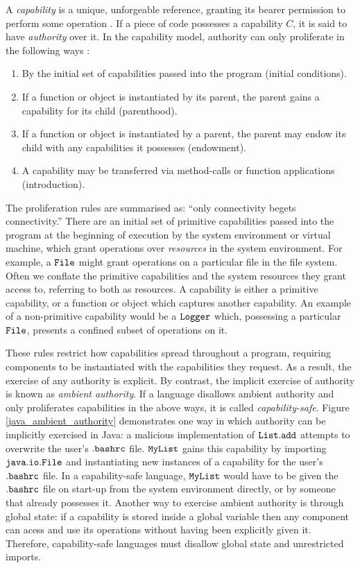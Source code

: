 A \textit{capability} is a unique, unforgeable reference, granting its bearer permission to perform some operation \cite{dennis66}. If a piece of code possesses a capability $C$, it is said to have \textit{authority} over it. In the capability model, authority can only proliferate in the following ways \cite{miller06}:

\begin{enumerate}
	\item By the initial set of capabilities passed into the program (initial conditions).
	\item If a function or object is instantiated by its parent, the parent gains a capability for its child (parenthood).
	\item If a function or object is instantiated by a parent, the parent may endow its child with any capabilities it possesses (endowment).
	\item A capability may be transferred via method-calls or function applications (introduction).
\end{enumerate}

The proliferation rules are summarised as: ``only connectivity begets connectivity.'' There are an initial set of primitive capabilities passed into the program at the beginning of execution by the system environment or virtual machine, which grant operations over \textit{resources} in the system environment. For example, a $\mathtt{File}$ might grant operations on a particular file in the file system. Often we conflate the primitive capabilities and the system resources they grant access to, referring to both as resources. A capability is either a primitive capability, or a function or object which captures another capability. An example of a non-primitive capability would be a $\mathtt{Logger}$ which, possessing a particular $\mathtt{File}$, presents a confined subset of operations on it.

These rules restrict how capabilities spread throughout a program, requiring components to be instantiated with the capabilities they request. As a result, the exercise of any authority is explicit. By contrast, the implicit exercise of authority is known as \textit{ambient authority}. If a language disallows ambient authority and only proliferates capabilities in the above ways, it is called \textit{capability-safe}. Figure \ref{java_ambient_authority} demonstrates one way in which authority can be implicitly exercised in Java: a malicious implementation of $\mathtt{List.add}$ attempts to overwrite the user's $\mathtt{.bashrc}$ file. $\mathtt{MyList}$ gains this capability by importing $\mathtt{java.io.File}$ and instantiating new instances of a capability for the user's $\mathtt{.bashrc}$ file. In a capability-safe language, $\mathtt{MyList}$ would have to be given the $\mathtt{.bashrc}$ file on start-up from the system environment directly, or by someone that already possesses it. Another way to exercise ambient authority is through global state: if a capability is stored inside a global variable then any component can acess and use its operations without having been explicitly given it. Therefore, capability-safe languages must disallow global state and unrestricted imports.

